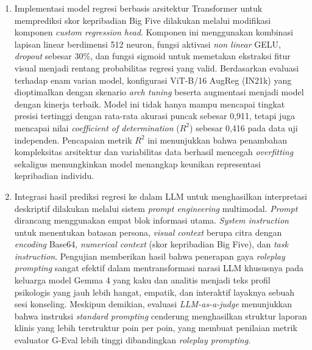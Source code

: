 \begin{enumerate}[nosep]

  \item Implementasi model regresi berbasis arsitektur Transformer untuk memprediksi skor kepribadian Big Five dilakukan melalui modifikasi komponen \textit{custom regression head}. Komponen ini menggunakan kombinasi lapisan linear berdimensi 512 neuron, fungsi aktivasi \textit{non linear} GELU, \textit{dropout} sebesar 30\%, dan fungsi sigmoid untuk memetakan ekstraksi fitur visual menjadi rentang probabilitas regresi yang valid. Berdasarkan evaluasi terhadap enam varian model, konfigurasi ViT-B/16 AugReg (IN21k) yang dioptimalkan dengan skenario \textit{arch tuning} beserta augmentasi menjadi model dengan kinerja terbaik. Model ini tidak hanya mampu mencapai tingkat presisi tertinggi dengan rata-rata akurasi puncak sebesar 0,911, tetapi juga mencapai nilai \textit{coefficient of determination} ($R^2$) sebesar 0,416 pada data uji independen. Pencapaian metrik $R^2$ ini menunjukkan bahwa penambahan kompleksitas arsitektur dan variabilitas data berhasil mencegah \textit{overfitting} sekaligus memungkinkan model menangkap keunikan representasi kepribadian individu.

  \item Integrasi hasil prediksi regresi ke dalam LLM untuk menghasilkan interpretasi deskriptif dilakukan melalui sistem \textit{prompt engineering} multimodal. \textit{Prompt} dirancang menggunakan empat blok informasi utama. \textit{System instruction} untuk menentukan batasan persona, \textit{visual context} berupa citra dengan \textit{encoding} Base64, \textit{numerical context} (skor kepribadian Big Five), dan \textit{task instruction}. Pengujian memberikan hasil bahwa penerapan gaya \textit{roleplay prompting} sangat efektif dalam mentransformasi narasi LLM khususnya pada keluarga model Gemma 4 yang kaku dan analitis menjadi teks profil psikologis yang jauh lebih hangat, empatik, dan interaktif layaknya sebuah sesi konseling. Meskipun demikian, evaluasi \textit{LLM-as-a-judge} menunjukkan bahwa instruksi \textit{standard prompting} cenderung menghasilkan struktur laporan klinis yang lebih terstruktur poin per poin, yang membuat penilaian metrik evaluator G-Eval lebih tinggi dibandingkan \textit{roleplay prompting}.


\end{enumerate}
